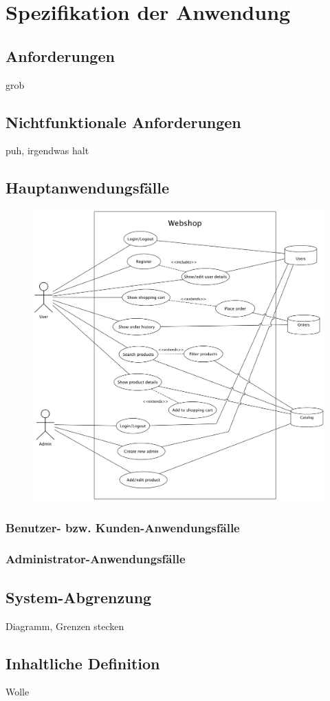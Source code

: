 \section{Spezifikation der Anwendung}
\subsection{Anforderungen}
grob
\subsection{Nichtfunktionale Anforderungen}
puh, irgendwas halt
\subsection{Hauptanwendungsfälle}
\begin{figure}[ht!]
	\centering
	\includegraphics[width=\linewidth]{bilder/kap4/use_cases}
	\caption{}
	\label{fig:usecases}
\end{figure}

\subsubsection{Benutzer- bzw. Kunden-Anwendungsfälle}
\subsubsection{Administrator-Anwendungsfälle}
\subsection{System-Abgrenzung}
Diagramm, Grenzen stecken
\subsection{Inhaltliche Definition}
Wolle